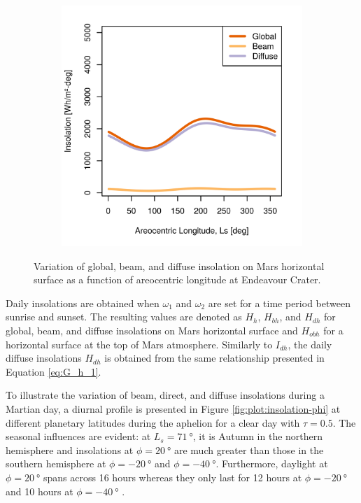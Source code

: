 \begin{figure}[h]
\begin{subfigure}[t]{\subfigureWidth}
  		\label{fig:sub:insolation-ls-tau-factor-2}
  	\end{subfigure}\hfill
	   \begin{subfigure}[t]{\subfigureWidth}
      \centering
  		\includegraphics[height=\graphicsHeight]{sections/martian-environment/plots/hh-hbh-and-hdh-as-a-function-of-ls-for-tau3-phi205-and-albedo-027}
  		\label{fig:sub:insolation-ls-tau-factor-3}
	   \end{subfigure}\hfill
	\caption{Variation of global, beam, and diffuse insolation on Mars horizontal surface as a function of areocentric longitude at Endeavour Crater.}
	\label{fig:plot:insolation-ls}
\vspace{-2ex}
\end{figure}

Daily insolations are obtained when $\omega_1$ and $\omega_2$ are set for a time period between sunrise and sunset. The resulting values are denoted as $H_{h}$, $H_{bh}$, and $H_{dh}$ for global, beam, and diffuse insolations on Mars horizontal surface and $H_{obh}$ for a horizontal surface at the top of Mars atmosphere. Similarly to $I_{dh}$, the daily diffuse insolations $H_{dh}$ is obtained from the same relationship presented in Equation \ref{eq:G_h_1}.

To illustrate the variation of beam, direct, and diffuse insolations during a Martian day, a diurnal profile is presented in Figure \ref{fig:plot:insolation-phi} at different planetary latitudes during the aphelion for a clear day with $\tau = 0.5$. The seasonal influences are evident: at $L_{s} = \SI{71}{\degree}$, it is Autumn in the northern hemisphere and insolations at $\phi = \SI{20}{\degree}$ are much greater than those in the southern hemisphere at $\phi = \SI{-20}{\degree}$ and $\phi = \SI{-40}{\degree}$. Furthermore, daylight at $\phi = \SI{20}{\degree}$ spans across 16 hours whereas they only last for 12 hours at $\phi = \SI{-20}{\degree}$ and 10 hours at $\phi = \SI{-40}{\degree}$ .


